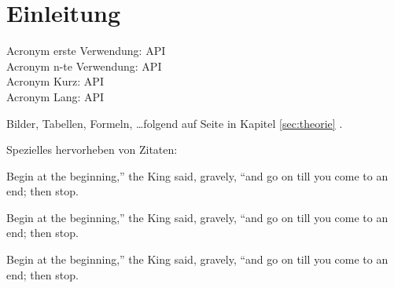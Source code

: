 \section{Einleitung}
\label{sec:einleitung}

Acronym erste Verwendung: \ac{API} \\
Acronym n-te Verwendung: \ac{API} \\
Acronym Kurz: \acs{API} \\
Acronym Lang: \acl{API}

\bigskip

Bilder, Tabellen, Formeln, \dots folgend auf Seite \pageref{sec:theorie} in Kapitel \ref{sec:theorie} .

\bigskip

Spezielles hervorheben von Zitaten:

\begin{fquote}
	Begin at the beginning,'' the King said, gravely, ``and go on till you come to an end; then stop.
\end{fquote}

\begin{fquote}
	Begin at the beginning,'' the King said, gravely, ``and go on till you come to an end; then stop.
\end{fquote}

\begin{fquote}
	Begin at the beginning,'' the King said, gravely, ``and go on till you come to an end; then stop.
\end{fquote}

